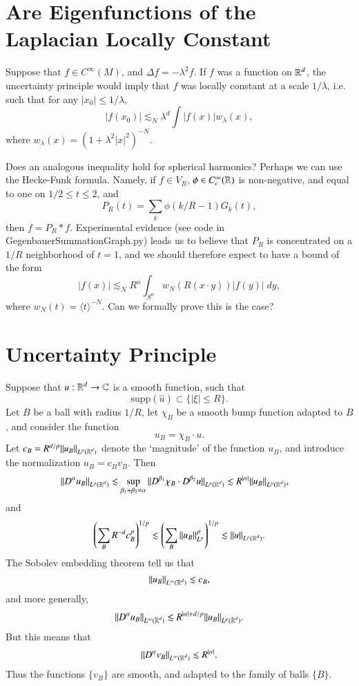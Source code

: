 \chapter{Are Eigenfunctions of the Laplacian Locally Constant}

Suppose that $f \in C^\infty(M)$, and $\Delta f = - \lambda^2 f$. If $f$ was a function on $\operatorname{\mathbb{R}}^d$, the uncertainty principle would imply that $f$ was locally constant at a scale $1/\lambda$, i.e. such that for any $|x_0| \leq 1/\lambda$,
%
\[ |f(x_0)| \lesssim_N \lambda^d \int |f(x)| w_\lambda(x), \]
%
where $w_\lambda(x) = (1 + \lambda^2 |x|^2 )^{-N}$.

Does an analogous inequality hold for spherical harmonics? Perhaps we can use the Hecke-Funk formula. Namely, if $f \in V_R$, $\phi \in C_c^\infty(\operatorname{\mathbb{R}})$ is non-negative, and equal to one on $1/2 \leq t \leq 2$, and
%
\[ P_R(t) = \sum_k \phi( k/R - 1 ) G_k(t), \]
%
then $f = P_R * f$. Experimental evidence (see code in GegenbauerSummationGraph.py) leads us to believe that $P_R$ is concentrated on a $1/R$ neighborhood of $t = 1$, and we should therefore expect to have a bound of the form
%
\[ |f(x)| \lesssim_N R^n \int_{S^n} w_N(R(x \cdot y)) |f(y)|\; dy, \]
%
where $w_N(t) = \langle t \rangle^{-N}$. Can we formally prove this is the case?








\chapter{Uncertainty Principle}

Suppose that $u: \operatorname{\mathbb{R}}^d \to \operatorname{\mathbb{C}}$ is a smooth function, such that
%
\[ \text{supp} \left( \widehat{u} \right) \subset \{ |\xi| \leq R \}. \]
%
Let $B$ be a ball with radius $1/R$, let $\chi_B$ be a smooth bump function adapted to $B$, and consider the function
%
\[ u_B = \chi_B \cdot u. \]
%
Let $c_B = R^{d/p} \| u_B \|_{L^p(\operatorname{\mathbb{R}}^d)}$ denote the `magnitude' of the function $u_B$, and introduce the normalization $u_B = c_B v_B$. Then
%
\begin{align*}
    \| D^\alpha u_B \|_{L^p(\operatorname{\mathbb{R}}^d)} &\lesssim \sup_{\beta_1 + \beta_2 = \alpha} \| D^{\beta_1} \chi_B \cdot D^{\beta_2} u \|_{L^p(\operatorname{\mathbb{R}}^d)} \lesssim R^{|\alpha|} \| u_B \|_{L^p(\operatorname{\mathbb{R}}^d)},
\end{align*}
%
and
%
\[ \left( \sum_B R^{-d} c_B^p \right)^{1/p} \lesssim \left( \sum_B \| u_B \|_{L^p}^p \right)^{1/p} \lesssim \| u \|_{L^p(\operatorname{\mathbb{R}}^d)}. \]
%
The Sobolev embedding theorem tell us that
%
\[ \| u_B \|_{L^\infty(\operatorname{\mathbb{R}}^d)} \lesssim c_B, \]
%
and more generally,
%
\[ \| D^\alpha u_B \|_{L^\infty(\operatorname{\mathbb{R}}^d)} \lesssim R^{|\alpha| + d/p} \| u_B \|_{L^p(\operatorname{\mathbb{R}}^d)}. \]
%
But this means that
%
\[ \| D^\alpha v_B \|_{L^\infty(\operatorname{\mathbb{R}}^d)} \lesssim R^{|\alpha|}. \]
%
Thus the functions $\{ v_B \}$ are smooth, and adapted to the family of balls $\{ B \}$.







